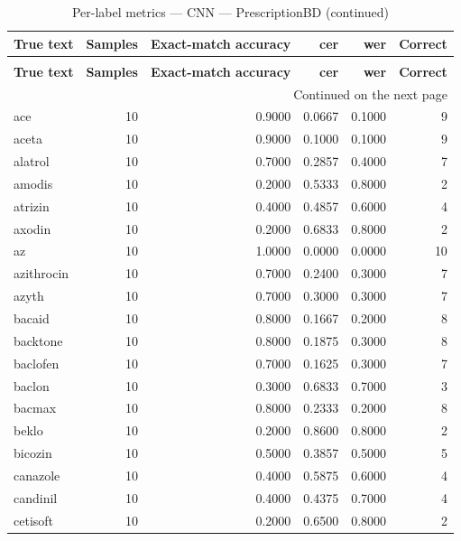 \begingroup
\setlength{\tabcolsep}{2.5pt}
\renewcommand{\arraystretch}{1.05}
\sloppy
\scriptsize
\begin{longtable}{p{3.0cm}rrrrr}
\caption{Per-label metrics — CNN — PrescriptionBD}\label{tab:e1-01cnn_evaluation-per-label}\\
\toprule
\textbf{True text} & \textbf{Samples} & \textbf{Exact-match accuracy} & \textbf{cer} & \textbf{wer} & \textbf{Correct} \\
\midrule
\endfirsthead
\caption*{Per-label metrics — CNN — PrescriptionBD (continued)}\\
\toprule
\textbf{True text} & \textbf{Samples} & \textbf{Exact-match accuracy} & \textbf{cer} & \textbf{wer} & \textbf{Correct} \\
\midrule
\endhead
\midrule
\multicolumn{6}{r}{Continued on the next page}\\
\endfoot
\bottomrule
\endlastfoot
ace & 10 & 0.9000 & 0.0667 & 0.1000 & 9 \\
aceta & 10 & 0.9000 & 0.1000 & 0.1000 & 9 \\
alatrol & 10 & 0.7000 & 0.2857 & 0.4000 & 7 \\
amodis & 10 & 0.2000 & 0.5333 & 0.8000 & 2 \\
atrizin & 10 & 0.4000 & 0.4857 & 0.6000 & 4 \\
axodin & 10 & 0.2000 & 0.6833 & 0.8000 & 2 \\
az & 10 & 1.0000 & 0.0000 & 0.0000 & 10 \\
azithrocin & 10 & 0.7000 & 0.2400 & 0.3000 & 7 \\
azyth & 10 & 0.7000 & 0.3000 & 0.3000 & 7 \\
bacaid & 10 & 0.8000 & 0.1667 & 0.2000 & 8 \\
backtone & 10 & 0.8000 & 0.1875 & 0.3000 & 8 \\
baclofen & 10 & 0.7000 & 0.1625 & 0.3000 & 7 \\
baclon & 10 & 0.3000 & 0.6833 & 0.7000 & 3 \\
bacmax & 10 & 0.8000 & 0.2333 & 0.2000 & 8 \\
beklo & 10 & 0.2000 & 0.8600 & 0.8000 & 2 \\
bicozin & 10 & 0.5000 & 0.3857 & 0.5000 & 5 \\
canazole & 10 & 0.4000 & 0.5875 & 0.6000 & 4 \\
candinil & 10 & 0.4000 & 0.4375 & 0.7000 & 4 \\
cetisoft & 10 & 0.2000 & 0.6500 & 0.8000 & 2 \\

\end{longtable}
